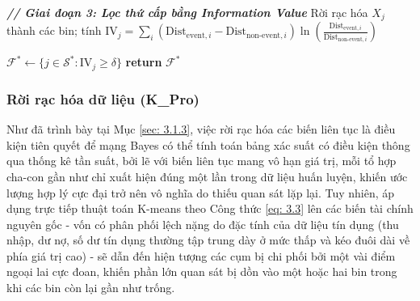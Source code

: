 \begin{algorithm}[H]
\begin{tcolorbox}
\begin{algorithmic}[1]
    \vspace{0.3cm}
    \Statex \textbf{\textit{// Giai đoạn 3: Lọc thứ cấp bằng Information Value}}
        \State Rời rạc hóa $X_j$ thành các bin; tính $\text{IV}_j = \sum_{i} \left(\text{Dist}_{\text{event},i} - \text{Dist}_{\text{non-event},i}\right) \ln\left(\frac{\text{Dist}_{\text{event},i}}{\text{Dist}_{\text{non-event},i}}\right)$
    \EndFor
    
    \State $\mathcal{F}^* \gets \{j \in \mathcal{S}^* : \text{IV}_j \geq \delta\}$
    \State \textbf{return} $\mathcal{F}^*$
\end{algorithmic}
\end{tcolorbox}
\end{algorithm}
\vspace{0.5em}

\newpage
\subsubsection{Rời rạc hóa dữ liệu (K\_Pro)}
\label{sec: 4.2.5}
\noindent
Như đã trình bày tại Mục \ref{sec: 3.1.3}, việc rời rạc hóa các biến liên tục là điều kiện tiên quyết để mạng Bayes có thể tính toán bảng xác suất có điều kiện thông qua thống kê tần suất, bởi lẽ với biến liên tục mang vô hạn giá trị, mỗi tổ hợp cha-con gần như chỉ xuất hiện đúng một lần trong dữ liệu huấn luyện, khiến ước lượng hợp lý cực đại trở nên vô nghĩa do thiếu quan sát lặp lại. Tuy nhiên, áp dụng trực tiếp thuật toán K-means theo Công thức \ref{eq: 3.3} lên các biến tài chính nguyên gốc - vốn có phân phối lệch nặng do đặc tính của dữ liệu tín dụng (thu nhập, dư nợ, số dư tín dụng thường tập trung dày ở mức thấp và kéo đuôi dài về phía giá trị cao) - sẽ dẫn đến hiện tượng các cụm bị chi phối bởi một vài điểm ngoại lai cực đoan, khiến phần lớn quan sát bị dồn vào một hoặc hai bin trong khi các bin còn lại gần như trống.

